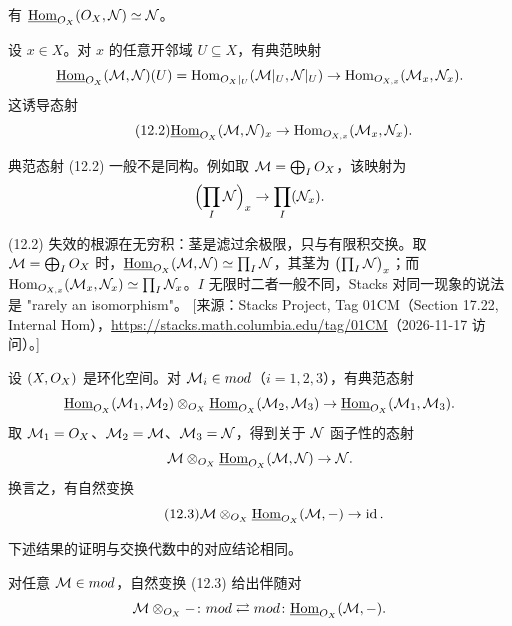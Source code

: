 \begin{example}\label{ex:12.4.6}
有 $\underline{\mathrm{Hom}}_{O_X}(O_X,\mathcal{N})\simeq\mathcal{N}$。
\end{example}

\begin{construction}\label{con:12.4.7}
设 $x\in X$。对 $x$ 的任意开邻域 $U\subseteq X$，有典范映射
\[
\underline{\mathrm{Hom}}_{O_X}(\mathcal{M},\mathcal{N})(U)=\operatorname{Hom}_{O_X|_U}(\mathcal{M}|_U,\mathcal{N}|_U)\to\operatorname{Hom}_{O_{X,x}}(\mathcal{M}_x,\mathcal{N}_x).
\]
这诱导态射
\begin{equation}\tag{12.2}\label{eq:12.2}
\underline{\mathrm{Hom}}_{O_X}(\mathcal{M},\mathcal{N})_x\to\operatorname{Hom}_{O_{X,x}}(\mathcal{M}_x,\mathcal{N}_x).
\end{equation}
\end{construction}

\begin{warning}\label{warn:12.4.8}
典范态射 (12.2) 一般不是同构。例如取 $\mathcal{M}=\bigoplus_IO_X$，该映射为
\[
\Bigl(\prod_I\mathcal{N}\Bigr)_x\to\prod_I(\mathcal{N}_x).
\]
\end{warning}

\begin{yizhu}
(12.2) 失效的根源在无穷积：茎是滤过余极限，只与有限积交换。取 $\mathcal{M}=\bigoplus_IO_X$ 时，$\underline{\mathrm{Hom}}_{O_X}(\mathcal{M},\mathcal{N})\simeq\prod_I\mathcal{N}$，其茎为 $\bigl(\prod_I\mathcal{N}\bigr)_x$；而 $\operatorname{Hom}_{O_{X,x}}(\mathcal{M}_x,\mathcal{N}_x)\simeq\prod_I\mathcal{N}_x$。$I$ 无限时二者一般不同，Stacks 对同一现象的说法是 "rarely an isomorphism"。
[来源：Stacks Project, Tag 01CM（Section 17.22, Internal Hom），\url{https://stacks.math.columbia.edu/tag/01CM}（2026-11-17 访问）。]
\end{yizhu}

\begin{construction}\label{con:12.4.9}
设 $(X,O_X)$ 是环化空间。对 $\mathcal{M}_i\in mod$（$i=1,2,3$），有典范态射
\[
\underline{\mathrm{Hom}}_{O_X}(\mathcal{M}_1,\mathcal{M}_2)\otimes_{O_X}\underline{\mathrm{Hom}}_{O_X}(\mathcal{M}_2,\mathcal{M}_3)\to\underline{\mathrm{Hom}}_{O_X}(\mathcal{M}_1,\mathcal{M}_3).
\]
取 $\mathcal{M}_1=O_X$、$\mathcal{M}_2=\mathcal{M}$、$\mathcal{M}_3=\mathcal{N}$，得到关于 $\mathcal{N}$ 函子性的态射
\[
\mathcal{M}\otimes_{O_X}\underline{\mathrm{Hom}}_{O_X}(\mathcal{M},\mathcal{N})\to\mathcal{N}.
\]
换言之，有自然变换
\begin{equation}\tag{12.3}\label{eq:12.3}
\mathcal{M}\otimes_{O_X}\underline{\mathrm{Hom}}_{O_X}(\mathcal{M},-)\to\operatorname{id}.
\end{equation}
\end{construction}

下述结果的证明与交换代数中的对应结论相同。

\begin{proposition}\label{prop:12.4.10}
对任意 $\mathcal{M}\in mod$，自然变换 (12.3) 给出伴随对
\[
\mathcal{M}\otimes_{O_X}-\colon mod\rightleftarrows mod\colon\underline{\mathrm{Hom}}_{O_X}(\mathcal{M},-).
\]
\end{proposition}

